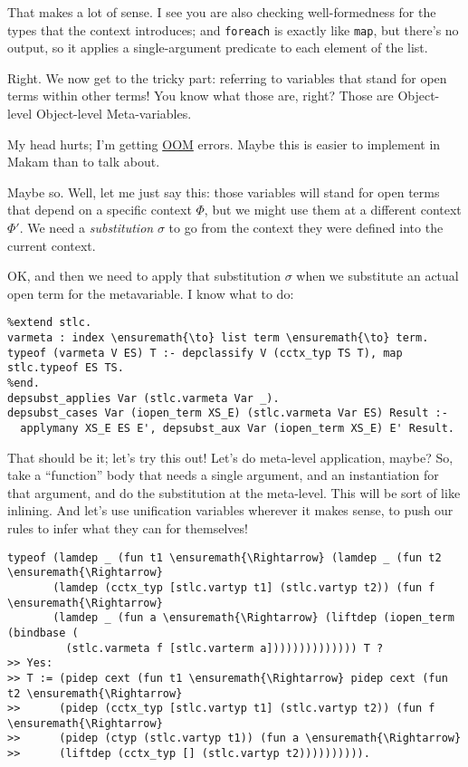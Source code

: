 \heroSTUDENT{} That makes a lot of sense. I see you are also checking
well-formedness for the types that the context introduces; and
\texttt{foreach} is exactly like \texttt{map}, but there's no output, so
it applies a single-argument predicate to each element of the list.

\heroADVISOR{} Right. We now get to the tricky part: referring to variables
that stand for open terms within other terms! You know what those are,
right? Those are Object-level Object-level Meta-variables.

\heroSTUDENT{} My head hurts; I'm getting
\href{https://en.wikipedia.org/wiki/Out_of_memory}{OOM} errors. Maybe
this is easier to implement in Makam than to talk about.

\heroADVISOR{} Maybe so. Well, let me just say this: those variables will
stand for open terms that depend on a specific context \(\Phi\), but we
might use them at a different context \(\Phi'\). We need a
\emph{substitution} \(\sigma\) to go from the context they were defined
into the current context.

\heroSTUDENT{} OK, and then we need to apply that substitution \(\sigma\) when
we substitute an actual open term for the metavariable. I know what to
do:

\vspace{-0.5em}

\begin{verbatim}
%extend stlc.
varmeta : index \ensuremath{\to} list term \ensuremath{\to} term.
typeof (varmeta V ES) T :- depclassify V (cctx_typ TS T), map stlc.typeof ES TS.
%end.
depsubst_applies Var (stlc.varmeta Var _).
depsubst_cases Var (iopen_term XS_E) (stlc.varmeta Var ES) Result :-
  applymany XS_E ES E', depsubst_aux Var (iopen_term XS_E) E' Result.
\end{verbatim}

\heroADVISOR{} That should be it; let's try this out! Let's do meta-level
application, maybe? So, take a ``function'' body that needs a single
argument, and an instantiation for that argument, and do the
substitution at the meta-level. This will be sort of like inlining. And
let's use unification variables wherever it makes sense, to push our
rules to infer what they can for themselves!

\begin{verbatim}
typeof (lamdep _ (fun t1 \ensuremath{\Rightarrow} (lamdep _ (fun t2 \ensuremath{\Rightarrow}
       (lamdep (cctx_typ [stlc.vartyp t1] (stlc.vartyp t2)) (fun f \ensuremath{\Rightarrow}
       (lamdep _ (fun a \ensuremath{\Rightarrow} (liftdep (iopen_term (bindbase (
         (stlc.varmeta f [stlc.varterm a]))))))))))))) T ?
>> Yes:
>> T := (pidep cext (fun t1 \ensuremath{\Rightarrow} pidep cext (fun t2 \ensuremath{\Rightarrow}
>>      (pidep (cctx_typ [stlc.vartyp t1] (stlc.vartyp t2)) (fun f \ensuremath{\Rightarrow}
>>      (pidep (ctyp (stlc.vartyp t1)) (fun a \ensuremath{\Rightarrow}
>>      (liftdep (cctx_typ [] (stlc.vartyp t2)))))))))).
\end{verbatim}

